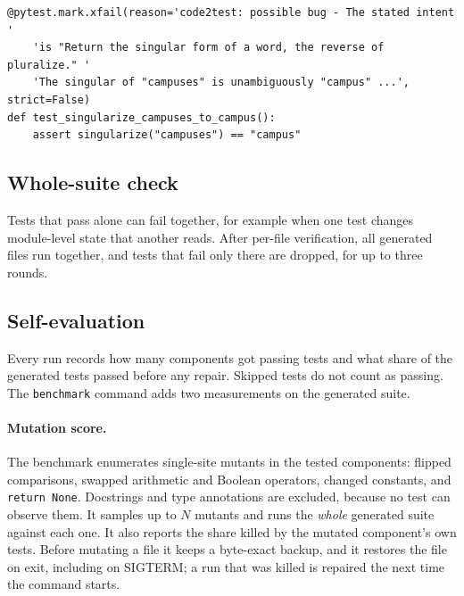 \documentclass[11pt]{article}
\newcommand{\toolname}{Code2Test}
\newcommand{\code}[1]{\texttt{#1}}
\begin{document}
\begin{lstlisting}[caption={A test \toolname{} kept as an expected failure, from the second run of inflection with M3 (Section~\ref{sec:second}). The reason is abbreviated.},label={lst:xfail},float=t]
@pytest.mark.xfail(reason='code2test: possible bug - The stated intent '
    'is "Return the singular form of a word, the reverse of pluralize." '
    'The singular of "campuses" is unambiguously "campus" ...', strict=False)
def test_singularize_campuses_to_campus():
    assert singularize("campuses") == "campus"
\end{lstlisting}

\subsection{Whole-suite check}
Tests that pass alone can fail together, for example when one test changes module-level state that another reads.
After per-file verification, all generated files run together, and tests that fail only there are dropped, for up to three rounds.

\subsection{Self-evaluation}\label{sec:benchmark}
Every run records how many components got passing tests and what share of the generated tests passed before any repair.
Skipped tests do not count as passing.
The \code{benchmark} command adds two measurements on the generated suite.

\paragraph{Mutation score.}
The benchmark enumerates single-site mutants in the tested components: flipped comparisons, swapped arithmetic and Boolean operators, changed constants, and \code{return None}.
Docstrings and type annotations are excluded, because no test can observe them.
It samples up to $N$ mutants and runs the \emph{whole} generated suite against each one.
It also reports the share killed by the mutated component's own tests.
Before mutating a file it keeps a byte-exact backup, and it restores the file on exit, including on SIGTERM; a run that was killed is repaired the next time the command starts.
\end{document}
